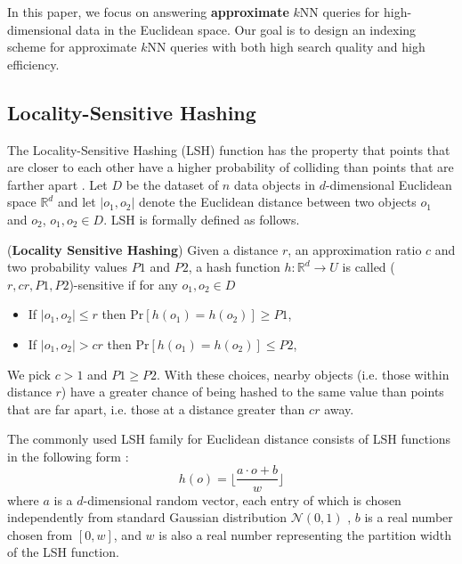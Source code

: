 In this paper, we focus on answering \textbf{approximate} $k$NN queries for high-dimensional data in the Euclidean space. Our goal is to design an indexing scheme for approximate $k$NN queries with both high search quality and high efficiency.

\subsection{Locality-Sensitive Hashing}

The Locality-Sensitive Hashing (LSH)
function has the property that points that are closer to each other
have a higher probability of colliding than points that are farther
apart \cite{orilsh}. Let $D$ be the dataset of $n$ data objects in $d$-dimensional Euclidean space $\mathbb{R}^d$ and let $|o_1,o_2|$ denote the Euclidean distance between two objects $o_1$ and $o_2$, $o_1,o_2\in D$. LSH is formally defined as
follows.

\begin{definition}
\label{def:lsh}
(\textbf{Locality Sensitive Hashing}) Given a distance $r$, an approximation ratio $c$ and two probability values $P1$ and $P2$, a hash function $h:\mathbb{R}^d\rightarrow U$ is called ($r,cr,P1,P2$)-sensitive if for any $o_1,o_2\in D$
\begin{itemize}
  \item If $|o_1,o_2|\leq r$ then $\text{Pr}[h(o_1)=h(o_2)]\geq P1$,
  \item If $|o_1,o_2|> cr$ then $\text{Pr}[h(o_1)=h(o_2)]\leq P2$,
\end{itemize}
\end{definition}


We pick $c>1$ and $P1\geq P2$. With these choices, nearby objects (i.e.
those within distance $r$) have a greater chance of being hashed to
the same value than points that are far apart, i.e. those at a
distance greater than $cr$ away.

The commonly used LSH family for Euclidean distance consists of LSH functions in the following form
\cite{datar}:
%
\begin{equation}\label{eq:lsh}
%
    h(o)=\bigg\lfloor \frac{a\cdot o+b}{w}\bigg\rfloor
%
\end{equation}
%
where $a$ is a $d$-dimensional random vector, each entry of which is
chosen independently from standard Gaussian distribution $\mathcal{N}(0,1)$ \cite{stabledist},
$b$ is a real number chosen from $[0,w]$, and $w$ is also a real
number representing the partition width of the LSH function.

